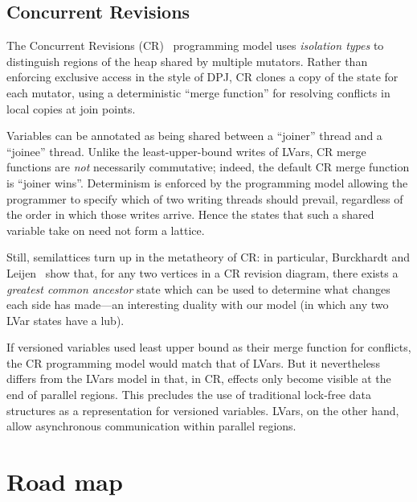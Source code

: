 \documentclass{article}
\begin{document}
\subsection{Concurrent Revisions}

The Concurrent Revisions (CR)~\cite{concurrent-revisions-haskell11}
programming model uses \emph{isolation types} \cite{isolation-types}
to distinguish regions of the heap shared by multiple mutators.
Rather than enforcing exclusive access in the style of DPJ, CR clones
a copy of the state for each mutator, using a deterministic ``merge
function'' for resolving conflicts in local copies at join points.

Variables can be annotated as being shared between a ``joiner'' thread
and a ``joinee'' thread.  Unlike the least-upper-bound writes of
LVars, CR merge functions are \emph{not} necessarily commutative;
indeed, the default CR merge function is ``joiner wins''.  Determinism
is enforced by the programming model allowing the programmer to
specify which of two writing threads should prevail, regardless of the
order in which those writes arrive.  Hence the states that such a
shared variable take on need not form a lattice.

Still, semilattices turn up in the metatheory of CR: in particular,
Burckhardt and Leijen~\cite{semantics-concurrent-revisions} show that,
for any two vertices in a CR revision diagram, there exists a
\emph{greatest common ancestor} state which can be used to determine
what changes each side has made---an interesting duality with our
model (in which any two LVar states have a lub). 

If versioned variables used least upper bound as their merge function
for conflicts, the CR programming model would match that of LVars.    But it nevertheless
differs from the LVars model in that, in CR, effects only become
visible at the end of parallel regions. 
This precludes the use of traditional lock-free data structures as a
representation for versioned variables.  LVars, on the other hand,
allow asynchronous communication within parallel regions.

\section{Road map}
\end{document}
